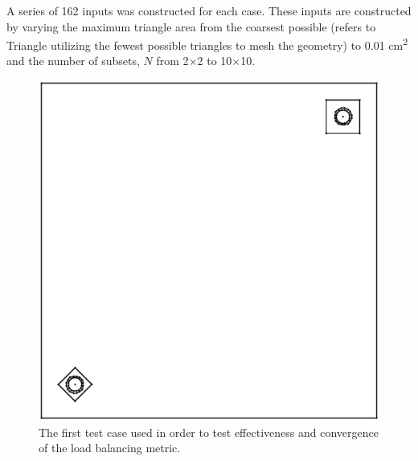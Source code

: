 \documentclass{anstrans}
\begin{document}
A series of 162 inputs was constructed for each case. These inputs are constructed by varying the maximum triangle area from the coarsest possible (refers to Triangle utilizing the fewest possible triangles to mesh the geometry) to 0.01 cm\textsuperscript{2} and the number of subsets, $N$ from 2$\times$2 to 10$\times$10.
\begin{figure}
\centering
\includegraphics[scale = 0.5]{figures/unbalanced_lattice.eps}
\caption{The first test case used in order to test effectiveness and convergence of the load balancing metric.}
\label{opp}
\end{figure}
\end{document}

